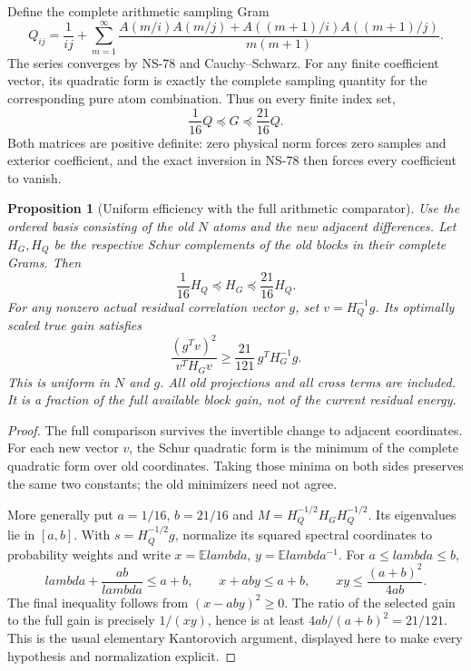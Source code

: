 \documentclass[11pt]{article}
\def\lambda{lambda}%
\newtheorem{proposition}[theorem]{Proposition}
\theoremstyle{remark}
\begin{document}
Define the complete arithmetic sampling Gram
\begin{equation}
 Q_{ij}=\frac1{ij}+\sum_{m=1}^\infty\frac{
 A(m/i)A(m/j)+A((m+1)/i)A((m+1)/j)}{m(m+1)}.
 \label{eq:ns80-sampling-gram}
\end{equation}
The series converges by NS-78 and Cauchy--Schwarz. For any finite
coefficient vector, its quadratic form is exactly the complete
sampling quantity for the corresponding pure atom combination.
Thus on every finite index set,
\begin{equation}
 \frac1{16}Q\preceq G\preceq\frac{21}{16}Q.
 \label{eq:ns80-full-comparison}
\end{equation}
Both matrices are positive definite: zero physical norm forces zero
samples and exterior coefficient, and the exact inversion in NS-78
then forces every coefficient to vanish.

\begin{proposition}[Uniform efficiency with the full arithmetic comparator]
\label{prop:ns80-uniform-efficiency}
Use the ordered basis consisting of the old $N$ atoms and the new
adjacent differences. Let $H_G,H_Q$ be the respective Schur complements
of the old blocks in their complete Grams. Then
\[
 \frac1{16}H_Q\preceq H_G\preceq\frac{21}{16}H_Q.
\]
For any nonzero \emph{actual} residual correlation vector $g$, set
$v=H_Q^{-1}g$. Its optimally scaled true gain satisfies
\begin{equation}
 \frac{(g^Tv)^2}{v^TH_Gv}
 \geq\frac{21}{121}\,g^TH_G^{-1}g.
 \label{eq:ns80-gain-fraction}
\end{equation}
This is uniform in $N$ and $g$. All old projections and all cross terms
are included. It is a fraction of the full available block gain, not
of the current residual energy.
\end{proposition}
\begin{proof}
The full comparison survives the invertible change to adjacent
coordinates. For each new vector $v$, the Schur quadratic form is the
minimum of the complete quadratic form over old coordinates. Taking
those minima on both sides preserves the same two constants; the old
minimizers need not agree.

More generally put $a=1/16$, $b=21/16$ and
$M=H_Q^{-1/2}H_GH_Q^{-1/2}$. Its eigenvalues lie in $[a,b]$.
With $s=H_Q^{-1/2}g$, normalize its squared spectral coordinates to
probability weights and write $x=\mathbb E\lambda$,
$y=\mathbb E\lambda^{-1}$. For $a\leq\lambda\leq b$,
\[
 \lambda+\frac{ab}{\lambda}\leq a+b,
 \qquad x+aby\leq a+b,
 \qquad xy\leq\frac{(a+b)^2}{4ab}.
\]
The final inequality follows from $(x-aby)^2\geq0$.
The ratio of the selected gain to the full gain is precisely
$1/(xy)$, hence is at least $4ab/(a+b)^2=21/121$.
This is the usual elementary Kantorovich argument, displayed here
to make every hypothesis and normalization explicit.
\end{proof}
\end{document}
